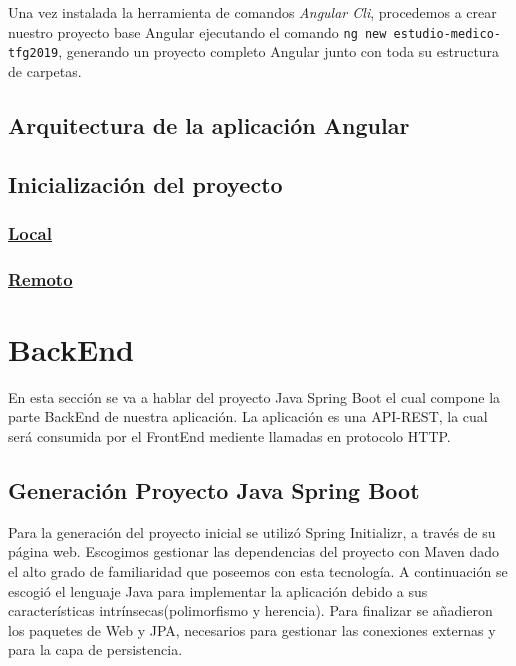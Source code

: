     \FloatBarrier
    
    Una vez instalada la herramienta de comandos \textit{Angular Cli}, procedemos a crear nuestro proyecto base Angular ejecutando el comando \texttt{ng new estudio-medico-tfg2019}, generando un proyecto completo Angular junto con toda su estructura de carpetas.
    
    
    
    \subsection{Arquitectura de la aplicación Angular}
    
    \subsection{Inicialización del proyecto}
        \subsubsection{\underline{Local}}
        \subsubsection{\underline{Remoto}}
    
    
    \section{BackEnd}
    
     En esta sección se va a hablar del proyecto Java Spring Boot el cual compone la parte BackEnd de nuestra aplicación. La aplicación es una API-REST, la cual será consumida por el FrontEnd mediente llamadas en protocolo HTTP. 
     
     
    \subsection{Generación Proyecto Java Spring Boot}
    Para la generación del proyecto inicial se utilizó Spring Initializr\cite{springinitializr}, a través de su página web. Escogimos gestionar las dependencias del proyecto con Maven dado el alto grado de familiaridad que poseemos con esta tecnología. A continuación se escogió el lenguaje Java para implementar la aplicación debido a sus características intrínsecas(polimorfismo y herencia). Para finalizar se añadieron los paquetes de Web y JPA, necesarios para gestionar las conexiones externas y para la capa de persistencia.
    
